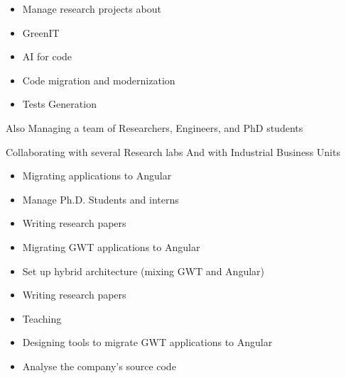 \documentclass[10pt,a4paper,ragged2e,withhyper]{altacv}
\begin{document}
\begin{paracol}{2}


\begin{itemize}
  \item Manage research projects about 
  \item GreenIT 
  \item AI for code
  \item Code migration and modernization 
  \item Tests Generation
  \end{itemize}
  
  Also Managing a team of Researchers, Engineers, and PhD students
  
  Collaborating with several Research labs And with Industrial Business Units

\divider


\begin{itemize}
  \item Migrating applications to Angular
  \item Manage Ph.D. Students and interns
  \item Writing research papers
\end{itemize}

\divider


\begin{itemize}
  \item Migrating GWT applications to Angular
  \item Set up hybrid architecture (mixing GWT and Angular)
  \item Writing research papers
  \item Teaching
\end{itemize}

\divider


\begin{itemize}
  \item Designing tools to migrate GWT applications to Angular
  \item Analyse the company's source code
\end{itemize}


\end{paracol}
\end{document}
